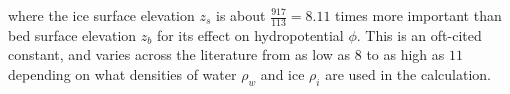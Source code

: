 where the ice surface elevation $z_s$ is about $\frac{917}{113} = 8.11$ times more important than bed surface elevation $z_b$ for its effect on hydropotential $\phi$.
This is an oft-cited constant, and varies across the literature from as low as $8$ to as high as $11$ depending on what densities of water $\rho_w$ and ice $\rho_i$ are used in the calculation.



